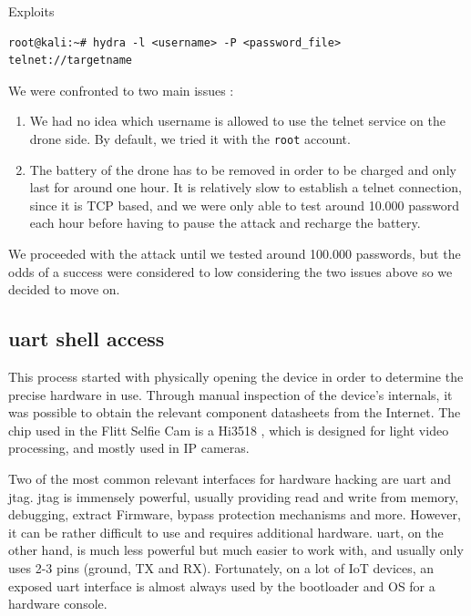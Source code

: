 \begin{chaptercover}{Exploits}
\begin{center}
\begin{minipage}{.95\linewidth}
\begin{lstlisting}
root@kali:~# hydra -l <username> -P <password_file> telnet://targetname
\end{lstlisting}
\end{minipage}
\end{center}

We were confronted to two main issues :
\begin{enumerate}
  \item We had no idea which username is allowed to use the telnet service on the drone side. By default, we tried it with the \texttt{root} account.
  \item The battery of the drone has to be removed in order to be charged and only last for around one hour. It is relatively slow to establish a telnet connection, since it is TCP based, and we were only able to test around 10.000 password each hour before having to pause the attack and recharge the battery.
\end{enumerate}

We proceeded with the attack until we tested around 100.000 passwords, but the odds of a success were considered to low considering the two issues above so we decided to move on.

\subsection{\acrshort{uart} shell access}

This process started with physically opening the device in order to determine the precise hardware in use. Through manual inspection of the device’s internals, it was possible to obtain the relevant component datasheets from the Internet. The chip used in the Flitt Selfie Cam is a Hi3518 \cite{hi3518-datasheet}, which is designed for light video processing, and mostly used in IP cameras. 

Two of the most common relevant interfaces for hardware hacking are \acrfull{uart} and \acrfull{jtag}. \acrshort{jtag} is immensely powerful, usually providing read and write from memory, debugging, extract Firmware, bypass protection mechanisms and more. However, it can be rather difficult to use and requires additional hardware. \acrshort{uart}, on the other hand, is much less powerful but much easier to work with, and usually only uses 2-3 pins (ground, TX and RX). Fortunately, on a lot of IoT devices, an exposed \acrshort{uart} interface is almost always used by the bootloader and OS for a hardware console.


\end{chaptercover}
